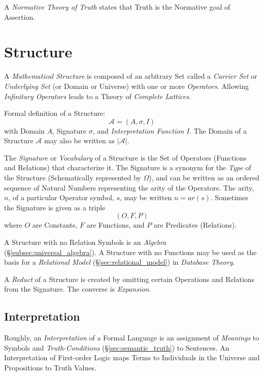 \documentclass{article}
\begin{document}
A \emph{Normative Theory of Truth} states that Truth is the Normative
goal of Assertion.

\section{Structure}\label{sec:mathematical_structure}

A \emph{Mathematical Structure} is composed of an arbitrary Set called
a \emph{Carrier Set} or \emph{Underlying Set} (or Domain or Universe)
with one or more \emph{Operators}. Allowing \emph{Infinitary
  Operators} leads to a Theory of \emph{Complete Lattices}.

Formal definition of a Structure:
\[
    \mathcal{A} = (A, \sigma, I)
\]
with Domain $A$, Signature $\sigma$, and \emph{Interpretation
  Function} $I$. The Domain of a Structure $\mathcal{A}$ may also be
written as $|\mathcal{A}|$.

The \emph{Signature} or \emph{Vocabulary} of a Structure is the Set of
Operators (Functions and Relations) that characterize it. The
Signature is a synonym for the \emph{Type} of the Structure
(Schematically represented by $\Omega$), and can be written as an
ordered sequence of Natural Numbers representing the arity of the
Operators. The arity, $n$, of a particular Operator symbol, $s$, may
be written $n=ar(s)$. Sometimes the Signature is given as a triple
\[
    (O,F,P)
\]
where $O$ are Constants, $F$ are Functions, and $P$ are Predicates
(Relations).

A Structure with no Relation Symbols is an \emph{Algebra}
(\S\ref{subsec:universal_algebra}). A Structure with no Functions may
be used as the basis for a \emph{Relational Model}
(\S\ref{sec:relational_model}) in \emph{Database Theory}.

A \emph{Reduct} of a Structure is created by omitting certain
Operations and Relations from the Signature. The converse is
\emph{Expansion}.

\subsection{Interpretation}\label{subsec:interpretation}

Roughly, an \emph{Interpretation} of a Formal Language is an
assignment of \emph{Meanings} to Symbols and \emph{Truth-Conditions}
(\S\ref{sec:semantic_truth}) to Sentences. An Interpretation of
First-order Logic maps Terms to Individuals in the Universe and
Propositions to Truth Values.
\end{document}

